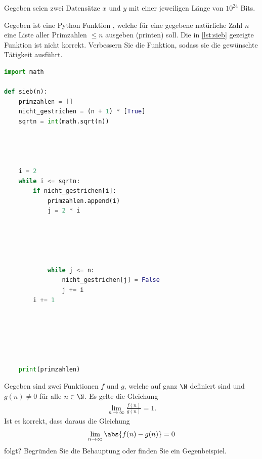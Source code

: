 \begin{questions}
\question Gegeben seien zwei Datensätze $x$ und $y$ mit einer jeweiligen Länge von $10^{24}$ Bits. 
\droptotalpoints

\clearpage
\question[2]
Gegeben ist eine Python Funktion , welche für eine gegebene natürliche Zahl $n$ eine Liste aller Primzahlen $\leq n$ ausgeben (printen) soll. Die in \cref{lst:sieb} gezeigte Funktion ist nicht korrekt. Verbessern Sie die Funktion, sodass sie die gewünschte Tätigkeit ausführt.
\begin{lstlisting}[language=Python,caption=(noch nicht korrektes) Sieb des Eratosthenes,numbers=none,label=lst:sieb]
import math

def sieb(n):
    primzahlen = []
    nicht_gestrichen = (n + 1) * [True]
    sqrtn = int(math.sqrt(n))




    i = 2
    while i <= sqrtn:
        if nicht_gestrichen[i]:
            primzahlen.append(i)
            j = 2 * i





            while j <= n:
                nicht_gestrichen[j] = False
                j += i
        i += 1






    print(primzahlen)
\end{lstlisting}



\question[2]
Gegeben sind zwei Funktionen $f$ und $g$, welche auf ganz $\N$ definiert sind und $g(n) \neq 0$ für alle $n\in\N$. Es gelte die Gleichung
\begin{align*}
  \lim_{n\to\infty}\frac{f(n)}{g(n)} = 1.
\end{align*}
Ist es korrekt, dass daraus die Gleichung
\begin{align*}
  \lim_{n\to\infty} \abs{f(n) - g(n)} = 0
\end{align*}
folgt? Begründen Sie die Behauptung oder finden Sie ein Gegenbeispiel.



\end{questions}
